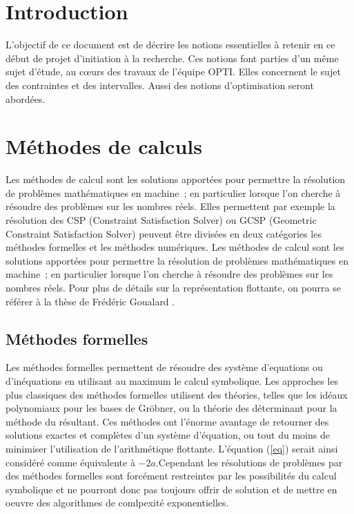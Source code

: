 \section{Introduction }
L'objectif de ce document est de décrire les notions essentielles à retenir en ce début de projet d'initiation à la recherche. Ces notions font parties d'un même sujet d'étude, au cœurs des travaux de l'équipe OPTI. Elles concernent le sujet des contraintes et des intervalles. Aussi des notions d'optimisation seront abordées.

\section{Méthodes de calculs}
Les méthodes de calcul sont les solutions apportées pour permettre la résolution de problèmes mathématiques en machine ; en particulier lorsque l'on cherche à résoudre des problèmes sur les nombres réels. Elles permettent par exemple la résolution des CSP (Constraint Satisfaction Solver) ou GCSP (Geometric Constraint Satisfaction Solver) peuvent être divisées en deux catégories les méthodes formelles et les méthodes numériques. Les méthodes de calcul sont les solutions apportées pour permettre la résolution de problèmes mathématiques en machine ; en particulier lorsque l'on cherche à résoudre des problèmes sur les nombres réels. Pour plus de détails sur la représentation flottante, on pourra se référer à la thèse de Frédéric Goualard \cite{Goualard}. 


\subsection{Méthodes formelles}
Les méthodes formelles permettent de résoudre des système d'equations ou d'inéquations en utilisant au maximum le calcul symbolique. Les approches les plus classiques des méthodes formelles utilisent des théories, telles que les idéaux polynomiaux pour les bases de Gröbner, ou la théorie des déterminant pour la méthode du résultant. Ces méthodes ont l'énorme avantage de retourner des solutions exactes et complètes d'un système d'équation, ou tout du moins de minimiser l'utilisation de l'arithmétique flottante. L'équation (\ref{eq}) serait ainsi considéré comme équivalente à $-2a$.Cependant les résolutions de problèmes par des méthodes formelles sont forcément restreintes par les possibilités du calcul symbolique et ne pourront donc pas toujours offrir de solution et  de mettre en oeuvre des algorithmes de comlpexité exponentielles.



